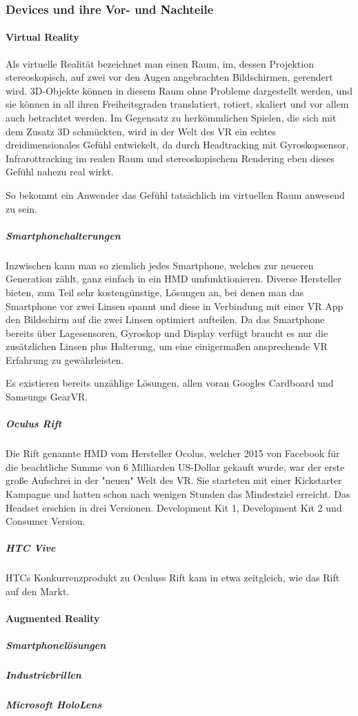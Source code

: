 \documentclass[a4paper,12pt]{scrartcl}
\begin{document}
\subsubsection{Devices und ihre Vor- und Nachteile}
\paragraph{Virtual Reality}
Als virtuelle Realität bezeichnet man einen Raum, im, dessen Projektion stereoskopisch, auf zwei vor den Augen angebrachten Bildschirmen, gerendert wird.
3D-Objekte können in diesem Raum ohne Probleme dargestellt werden, und sie können in all ihren Freiheitsgraden translatiert, rotiert, skaliert und vor allem auch betrachtet werden. Im Gegensatz zu herkömmlichen Spielen, die sich mit dem Zusatz 3D schmückten, wird in der Welt des VR ein echtes dreidimensionales Gefühl entwickelt, da durch Headtracking mit Gyroskopsensor, Infrarottracking im realen Raum und stereoskopischem Rendering eben dieses Gefühl nahezu real wirkt.

So bekommt ein Anwender das Gefühl tatsächlich im virtuellen Raum anwesend zu sein.
\subparagraph{Smartphonehalterungen}
Inzwischen kann man so ziemlich jedes Smartphone, welches zur neueren Generation zählt, ganz einfach in ein HMD umfunktionieren. Diverse Hersteller bieten, zum Teil sehr kostengünstige, Lösungen an, bei denen man das Smartphone vor zwei Linsen spannt und diese in Verbindung mit einer VR App den Bildschirm auf die zwei Linsen optimiert aufteilen. Da das Smartphone bereits über Lagesensoren, Gyroskop und Display verfügt braucht es nur die zusätzlichen Linsen plus Halterung, um eine einigermaßen ansprechende VR Erfahrung zu gewährleisten.

Es existieren bereits unzählige Lösungen, allen voran Googles Cardboard und Samsungs GearVR.
\subparagraph{Oculus Rift}
Die Rift genannte HMD vom Hersteller Ocolus, welcher 2015 von Facebook für die beachtliche Summe von 6 Milliarden US-Dollar gekauft wurde, war der erste große Aufschrei in der "neuen" Welt des VR. Sie starteten mit einer Kickstarter Kampagne und hatten schon nach wenigen Stunden das Mindestziel erreicht. Das Headset erschien in drei Versionen. Development Kit 1, Development Kit 2 und Consumer Version.
\subparagraph{HTC Vive}
HTCs Konkurrenzprodukt zu Oculuss Rift kam in etwa zeitgleich, wie das Rift auf den Markt.
\paragraph{Augmented Reality}
\subparagraph{Smartphonelösungen}
\subparagraph{Industriebrillen}
\subparagraph{Microsoft HoloLens}
\end{document}
